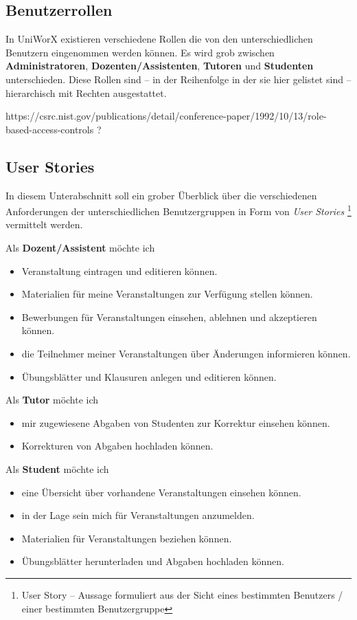 \documentclass[11pt,a4paper,twoside,ngerman]{article}
\begin{document}
\subsection{Benutzerrollen}
In UniWorX existieren verschiedene Rollen die von den unterschiedlichen Benutzern eingenommen werden können. Es wird grob zwischen \textbf{Administratoren}, \textbf{Dozenten/Assistenten}, \textbf{Tutoren} und \textbf{Studenten} unterschieden. Diese Rollen sind -- in der Reihenfolge in der sie hier gelistet sind -- hierarchisch mit Rechten ausgestattet.

https://csrc.nist.gov/publications/detail/conference-paper/1992/10/13/role-based-access-controls ?

\subsection{User Stories} \label{sec:useerstories}
In diesem Unterabschnitt soll ein grober Überblick über die verschiedenen Anforderungen der unterschiedlichen Benutzergruppen in Form von \emph{User Stories} \footnote{User Story -- Aussage formuliert aus der Sicht eines bestimmten Benutzers / einer bestimmten Benutzergruppe} vermittelt werden.

\bigskip
\noindent
Als \textbf{Dozent/Assistent} möchte ich 
\begin{itemize}
    \item Veranstaltung eintragen und editieren können.
    \item Materialien für meine Veranstaltungen zur Verfügung stellen können.
    \item Bewerbungen für Veranstaltungen einsehen, ablehnen und akzeptieren können.
    \item die Teilnehmer meiner Veranstaltungen über Änderungen informieren können.
    \item Übungsblätter und Klausuren anlegen und editieren können.
\end{itemize}

\noindent
Als \textbf{Tutor} möchte ich 
\begin{itemize}
    \item mir zugewiesene Abgaben von Studenten zur Korrektur einsehen können.
    \item Korrekturen von Abgaben hochladen können.
\end{itemize}

\noindent
Als \textbf{Student} möchte ich
\begin{itemize}
    \item eine Übersicht über vorhandene Veranstaltungen einsehen können.
    \item in der Lage sein mich für Veranstaltungen anzumelden.
    \item Materialien für Veranstaltungen beziehen können.
    \item Übungsblätter herunterladen und Abgaben hochladen können.
\end{itemize}
\end{document}
